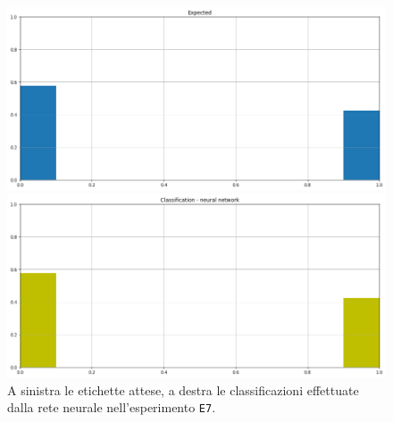 \documentclass[12pt]{report}
\theoremstyle{definition}
\begin{document}
\begin{figure}
\centering
    \begin{minipage}{0.48\textwidth}
        \includegraphics[width=\linewidth]{images/experiment_kaggle/expected_classification.png}
    \end{minipage}
    \begin{minipage}{0.48\textwidth}
        \includegraphics[width=\linewidth]{images/experiment_kaggle/prediction_classification_nn.png}
    \end{minipage}
    \caption{A sinistra le etichette attese, a destra le classificazioni effettuate dalla rete neurale nell'esperimento \texttt{E7}.}
    \label{nn_exp7}
\end{figure} 
\end{document}
